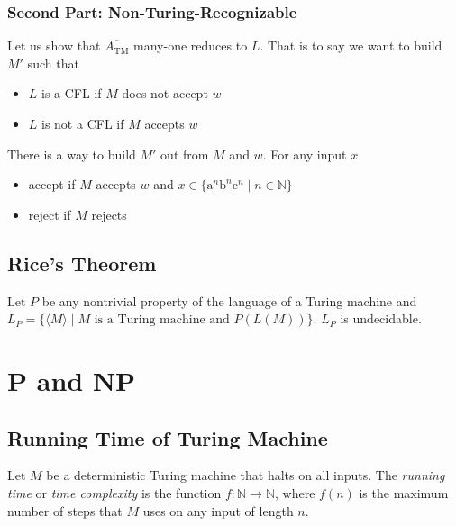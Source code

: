 \documentclass[11pt]{article}
\begin{document}
\subsubsection{Second Part: Non-Turing-Recognizable}

Let us show that $\overline{A_{\mathrm{TM}}}$ many-one reduces to $L$. That is to say we want to build $M'$ such
that
\begin{itemize}
\item $L$ is a CFL if $M$ does not accept $w$
\item $L$ is not a CFL if $M$ accepts $w$
\end{itemize}

There is a way to build $M'$ out from $M$ and $w$. For any input $x$
\begin{itemize}
\item accept if $M$ accepts $w$ and $x \in \{\mathrm{a}^n\mathrm{b}^n\mathrm{c}^n \mid n \in \mathbb{N}\}$
\item reject if $M$ rejects
\end{itemize}

\subsection{Rice's Theorem}

\begin{theorem}
Let $P$ be any nontrivial property of the language of a Turing machine and \\
$L_P = \{\langle M \rangle \mid M \text{ is a Turing machine and } P(L(M))\}$. $L_P$ is
undecidable.
\end{theorem}

\section{P and NP}

\subsection{Running Time of Turing Machine}

\begin{definition}
Let $M$ be a deterministic Turing machine that halts on all inputs. The \emph{running time} or
\emph{time complexity} is the function $f: \mathbb{N} \rightarrow \mathbb{N}$, where $f(n)$ is the
maximum number of steps that $M$ uses on any input of length $n$.
\end{definition}
\end{document}
